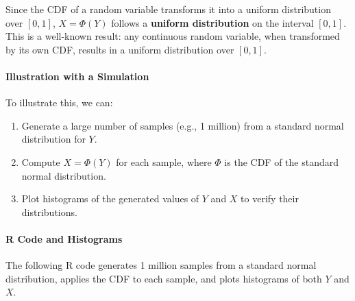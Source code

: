 \documentclass[
]{article}
\providecommand{\tightlist}{%
  \setlength{\itemsep}{0pt}\setlength{\parskip}{0pt}}
\begin{document}
Since the CDF of a random variable transforms it into a uniform
distribution over \([0, 1]\), \(X = \Phi(Y)\) follows a \textbf{uniform
distribution} on the interval \([0, 1]\). This is a well-known result:
any continuous random variable, when transformed by its own CDF, results
in a uniform distribution over \([0,1]\).

\hypertarget{illustration-with-a-simulation}{%
\paragraph{Illustration with a
Simulation}\label{illustration-with-a-simulation}}

To illustrate this, we can:

\begin{enumerate}
\def\labelenumi{\arabic{enumi}.}
\tightlist
\item
  Generate a large number of samples (e.g., 1 million) from a standard
  normal distribution for \(Y\).
\item
  Compute \(X = \Phi(Y)\) for each sample, where \(\Phi\) is the CDF of
  the standard normal distribution.
\item
  Plot histograms of the generated values of \(Y\) and \(X\) to verify
  their distributions.
\end{enumerate}

\hypertarget{r-code-and-histograms}{%
\paragraph{R Code and Histograms}\label{r-code-and-histograms}}

The following R code generates 1 million samples from a standard normal
distribution, applies the CDF to each sample, and plots histograms of
both \(Y\) and \(X\).
\end{document}
